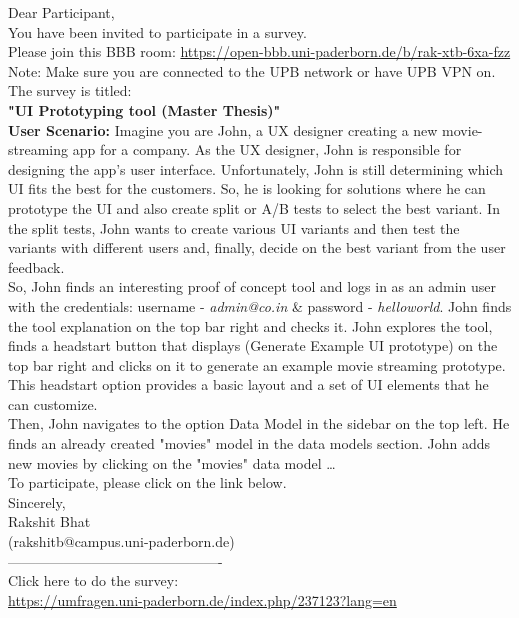 \begin{tcolorbox}[title=\texttt{From: Rakshit\\ To: Participant\\ Date: Wed 05/06/2019 15:00\\ Subject: Invitation to participate in a survey}]
Dear Participant,\\
You have been invited to participate in a survey.\\
Please join this BBB room:
\url{https://open-bbb.uni-paderborn.de/b/rak-xtb-6xa-fzz} \\
        
Note: Make sure you are connected to the UPB network or have UPB VPN on.\\

The survey is titled:\\
\textbf{"UI Prototyping tool (Master Thesis)"}\\

\textbf{User Scenario:} Imagine you are John, a UX designer creating a new movie-streaming app for a company. As the UX designer, John is responsible for designing the app's user interface. Unfortunately, John is still determining which UI fits the best for the customers. So, he is looking for solutions where he can prototype the UI and also create split or A/B tests to select the best variant. In the split tests, John wants to create various UI variants and then test the variants with different users and, finally, decide on the best variant from the user feedback. \\

So, John finds an interesting proof of concept tool and logs in as an admin user with the credentials: username - \textit{admin@co.in} \& password - \textit{helloworld}. John finds the tool explanation on the top bar right and checks it. John explores the tool, finds a headstart button that displays (Generate Example UI prototype) on the top bar right and clicks on it to generate an example movie streaming prototype. This headstart option provides a basic layout and a set of UI elements that he can customize. \\
Then, John navigates to the option Data Model in the sidebar on the top left. He finds an already created "movies" model in the data models section. John adds new movies by clicking on the "movies" data model
\dots \\

To participate, please click on the link below.\\
    
Sincerely,\\
Rakshit Bhat\\
(rakshitb@campus.uni-paderborn.de)\\
----------------------------------------------\\
Click here to do the survey:\\
\url{https://umfragen.uni-paderborn.de/index.php/237123?lang=en}
\end{tcolorbox}


